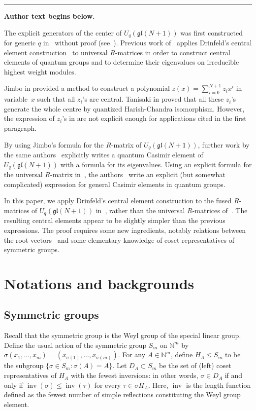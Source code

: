 \documentclass[11pt]{article}
\numberwithin{equation}{section}
\numberwithin{equation}{section}
\DeclareMathOperator{\inv}{inv}
\newcommand{\Uqgl}{{U_q(\mathfrak{gl}(N+1))}}
\begin{document}
\medskip\hrule\medskip\noindent\textbf{Author text begins below.}\par
\setcounter{section}{1}
The explicit generators of the center of $\Uqgl$ was first constructed for generic $q$
in~\cite{FaddeevRT} without proof (see~\cite{Arnaudon:1993yg}). Previous work of~\cite{ZGBCMP} applies Drinfeld's central element construction~\cite{Drin90} to universal $R$-matrices in order to construct central elements of quantum groups and to determine their eigenvalues on irreducible highest weight modules.

Jimbo in \cite{Jimbo1986} provided a method to construct a polynomial $z(x) = \sum_{i=0}^{N+1} z_ix^i$ in variable~$x$ such that all $z_i$’s are central. Tanisaki in \cite{Tanisaki1992KILLINGFH} proved that all these $z_i$’s generate the whole centre by quantized Harish-Chandra isomorphism. However, the expression of $z_i$’s in \cite{Jimbo1986} are not explicit enough for applications cited in the first paragraph.

By using Jimbo's \cite{Jimbo1986} formula for the $R$-matrix of $\Uqgl$, further work by the same authors~\cite{GZB} explicitly writes a quantum Casimir element of $\Uqgl$ with a formula for its eigenvalues. Using an explicit formula for the universal $R$-matrix in~\cite{KirillovResh}, the authors~\cite{ZGBJPhysA} write an explicit (but somewhat complicated) expression for general Casimir elements in quantum groups.

In this paper, we apply Drinfeld's central element construction to the fused $R$-matrices of $\Uqgl$ in~\cite{Jimbo1986}, rather than the universal $R$-matrices of~\cite{KirillovResh}. The resulting central elements appear to be slightly simpler than the previous expressions. The proof requires some new ingredients, notably relations between the root vectors~\cite{KT91,Lusztig90,Xi1994} and some elementary knowledge of coset representatives of symmetric groups.

\setcounter{section}{1}
\section{Notations and backgrounds}
\subsection{Symmetric groups}
Recall that the symmetric group is the Weyl group of the special linear group. Define the usual action of the symmetric group $S_m$ on $\mathbb{N}^m$ by $ \sigma(x_1,\dots,x_m)= (x_{\sigma(1)}, \dots, x_{\sigma(m)})$. For any $A\in \mathbb{N}^m$, define $ H_A \le S_m $ to be the subgroup $ \{\sigma \in S_m\colon \sigma(A)=A\}$. Let $ D_A \subset S_m $ be the set of (left) coset representatives of $H_A$ with the fewest inversions: in other words, $ \sigma \in D_A $ if and only if $ \inv (\sigma) \le \inv (\tau) $ for every $ \tau \in \sigma H_A$. Here, $\inv$ is the length function defined as the fewest number
of simple reflections constituting the Weyl group element.
\end{document}
